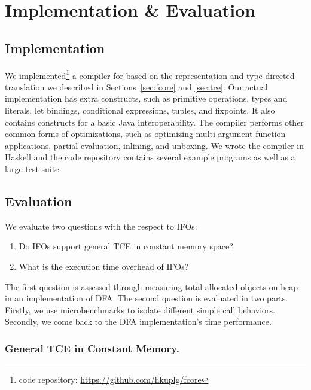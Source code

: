 \section{Implementation \& Evaluation}


\subsection{Implementation}\label{sec:implementation}
We implemented\footnote{\name code repository: \url{https://github.com/hkuplg/fcore}}
 a compiler for \name based on the
representation and type-directed translation we described in
Sections~\ref{sec:fcore} and \ref{sec:tce}. Our actual implementation has extra constructs,
 such as primitive operations, types and literals, let bindings, conditional expressions,
tuples, and fixpoints. It also contains constructs for a basic Java interoperability.
The compiler performs other common forms of optimizations, such as optimizing multi-argument 
function applications, partial evaluation, inlining, and unboxing.
 We wrote the compiler in Haskell and the code repository contains several example programs
 as well as a large test suite.

\subsection{Evaluation}
We evaluate two questions with the respect to IFOs:
\begin{enumerate}
	\item Do IFOs support general TCE in constant memory space?
	\item What is the execution time overhead of IFOs?
\end{enumerate}

The first question is assessed through measuring total allocated objects on
heap in an implementation of DFA. The second question is evaluated in two parts.
Firstly, we use microbenchmarks to isolate different simple call behaviors. Secondly, 
we come back to the DFA implementation's time performance.

\subsubsection{General TCE in Constant Memory.}


